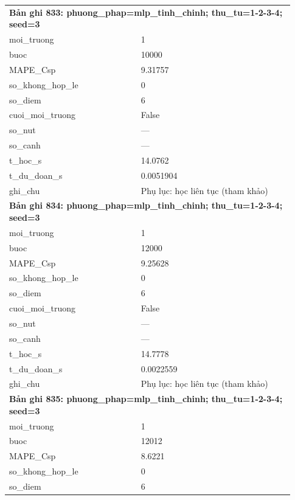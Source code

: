 \begin{longtable}{p{0.43\linewidth}p{0.50\linewidth}}
\midrule
\multicolumn{2}{p{0.95\linewidth}}{\textbf{Bản ghi 833: phuong\_phap=mlp\_tinh\_chinh; thu\_tu=1-2-3-4; seed=3}} \\
moi\_\allowbreak truong & 1 \\
buoc & 10000 \\
MAPE\_\allowbreak Csp & 9.31757 \\
so\_\allowbreak khong\_\allowbreak hop\_\allowbreak le & 0 \\
so\_\allowbreak diem & 6 \\
cuoi\_\allowbreak moi\_\allowbreak truong & False \\
so\_\allowbreak nut & — \\
so\_\allowbreak canh & — \\
t\_\allowbreak hoc\_\allowbreak s & 14.0762 \\
t\_\allowbreak du\_\allowbreak doan\_\allowbreak s & 0.0051904 \\
ghi\_\allowbreak chu & Phụ lục: học liên tục (tham khảo) \\
\midrule
\multicolumn{2}{p{0.95\linewidth}}{\textbf{Bản ghi 834: phuong\_phap=mlp\_tinh\_chinh; thu\_tu=1-2-3-4; seed=3}} \\
moi\_\allowbreak truong & 1 \\
buoc & 12000 \\
MAPE\_\allowbreak Csp & 9.25628 \\
so\_\allowbreak khong\_\allowbreak hop\_\allowbreak le & 0 \\
so\_\allowbreak diem & 6 \\
cuoi\_\allowbreak moi\_\allowbreak truong & False \\
so\_\allowbreak nut & — \\
so\_\allowbreak canh & — \\
t\_\allowbreak hoc\_\allowbreak s & 14.7778 \\
t\_\allowbreak du\_\allowbreak doan\_\allowbreak s & 0.0022559 \\
ghi\_\allowbreak chu & Phụ lục: học liên tục (tham khảo) \\
\midrule
\multicolumn{2}{p{0.95\linewidth}}{\textbf{Bản ghi 835: phuong\_phap=mlp\_tinh\_chinh; thu\_tu=1-2-3-4; seed=3}} \\
moi\_\allowbreak truong & 1 \\
buoc & 12012 \\
MAPE\_\allowbreak Csp & 8.6221 \\
so\_\allowbreak khong\_\allowbreak hop\_\allowbreak le & 0 \\
so\_\allowbreak diem & 6 \\

\end{longtable}
